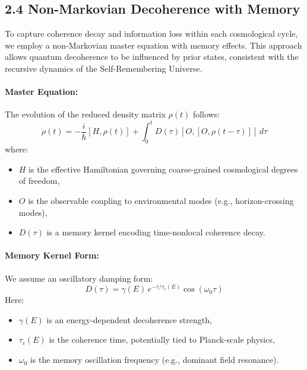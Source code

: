 \subsection*{2.4 Non-Markovian Decoherence with Memory}

To capture coherence decay and information loss within each cosmological cycle, we employ a non-Markovian master equation with memory effects. This approach allows quantum decoherence to be influenced by prior states, consistent with the recursive dynamics of the Self-Remembering Universe.

\paragraph{Master Equation:}

The evolution of the reduced density matrix \( \rho(t) \) follows:
\begin{equation}
\dot{\rho}(t) = -\frac{i}{\hbar}[H, \rho(t)] + \int_0^t D(\tau) [O, [O, \rho(t - \tau)]] \, d\tau
\end{equation}
where:
\begin{itemize}
    \item \( H \) is the effective Hamiltonian governing coarse-grained cosmological degrees of freedom,
    \item \( O \) is the observable coupling to environmental modes (e.g., horizon-crossing modes),
    \item \( D(\tau) \) is a memory kernel encoding time-nonlocal coherence decay.
\end{itemize}

\paragraph{Memory Kernel Form:}

We assume an oscillatory damping form:
\begin{equation}
D(\tau) = \gamma(E) \, e^{-\tau / \tau_c(E)} \cos(\omega_0 \tau)
\end{equation}
Here:
\begin{itemize}
    \item \( \gamma(E) \) is an energy-dependent decoherence strength,
    \item \( \tau_c(E) \) is the coherence time, potentially tied to Planck-scale physics,
    \item \( \omega_0 \) is the memory oscillation frequency (e.g., dominant field resonance).
\end{itemize}

